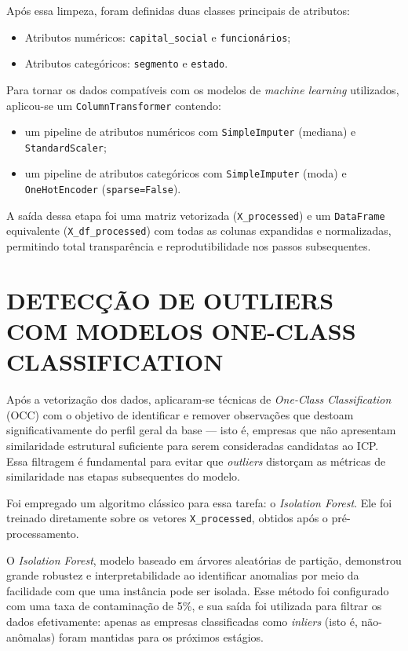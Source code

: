 Após essa limpeza, foram definidas duas classes principais de atributos:
\begin{itemize}
    \item Atributos numéricos: \texttt{capital\_social} e \texttt{funcionários};
    \item Atributos categóricos: \texttt{segmento} e \texttt{estado}.
\end{itemize}

Para tornar os dados compatíveis com os modelos de \textit{machine learning} utilizados, aplicou-se um \texttt{ColumnTransformer} contendo:
\begin{itemize}
    \item um pipeline de atributos numéricos com \texttt{SimpleImputer} (mediana) e \texttt{StandardScaler};
    \item um pipeline de atributos categóricos com \texttt{SimpleImputer} (moda) e \texttt{OneHotEncoder} (\texttt{sparse=False}).
\end{itemize}

A saída dessa etapa foi uma matriz vetorizada (\texttt{X\_processed}) e um \texttt{DataFrame} equivalente (\texttt{X\_df\_processed}) com todas as colunas expandidas e normalizadas, permitindo total transparência e reprodutibilidade nos passos subsequentes. 


\section{DETECÇÃO DE OUTLIERS COM MODELOS ONE-CLASS CLASSIFICATION}

Após a vetorização dos dados, aplicaram-se técnicas de \textit{One-Class Classification} (OCC) com o objetivo de identificar e remover observações que destoam significativamente do perfil geral da base — isto é, empresas que não apresentam similaridade estrutural suficiente para serem consideradas candidatas ao ICP. Essa filtragem é fundamental para evitar que \textit{outliers} distorçam as métricas de similaridade nas etapas subsequentes do modelo.

Foi empregado um algoritmo clássico para essa tarefa: o \textit{Isolation Forest}. Ele foi treinado diretamente sobre os vetores \texttt{X\_processed}, obtidos após o pré-processamento.

O \textit{Isolation Forest}, modelo baseado em árvores aleatórias de partição, demonstrou grande robustez e interpretabilidade ao identificar anomalias por meio da facilidade com que uma instância pode ser isolada. Esse método foi configurado com uma taxa de contaminação de 5\%, e sua saída foi utilizada para filtrar os dados efetivamente: apenas as empresas classificadas como \textit{inliers} (isto é, não-anômalas) foram mantidas para os próximos estágios.

